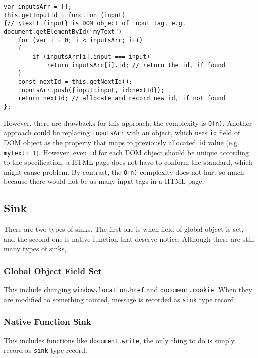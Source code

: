 \begin{verbatim}
var inputsArr = [];
this.getInputId = function (input)
{// \texttt{input} is DOM object of input tag, e.g. document.getElementById("myText")
	for (var i = 0; i < inputsArr; i++)
	{
		if (inputsArr[i].input === input)
			return inputsArr[i].id; // return the id, if found 
	}
	const nextId = this.getNextId();
	inputsArr.push({input:input, id:nextId});
	return nextId; // allocate and record new id, if not found
};
\end{verbatim}

However, there are drawbacks for this approach: the complexity is \texttt{O(n)}. Another approach could be replacing \texttt{inputsArr} with an object, which uses \texttt{id} field of DOM object as the property that maps to previously allocated \texttt{id} value (e.g. \texttt{{myText: 1}}). However, even \texttt{id} for each DOM object should be unique according to the specification, a HTML page does not have to conform the standard, which might cause problem. By contrast, the \texttt{O(n)} complexity does not hurt so much because there would not be as many input tags in a HTML page. 

\subsection{Sink}

There are two types of sinks. The first one is when field of global object is set, and the second one is native function that deserve notice. Although there are still many types of sinks, 

\subsubsection{Global Object Field Set}

This include changing \texttt{window.location.href} and \texttt{document.cookie}. When they are modified to something tainted, message is recorded as \texttt{sink} type record.

\subsubsection{Native Function Sink}

This includes functions like \texttt{document.write}, the only thing to do is simply record as \texttt{sink} type record.


